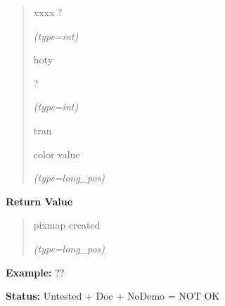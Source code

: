 \begin{boxedminipage}{\funcwidth}
\begin{quote}
\begin{Ventry}{xxxx}
          ?

            {\it (type=int)}

          \item[hoty]

          ?

            {\it (type=int)}

          \item[tran]

          color value

            {\it (type=long\_pos)}

        \end{Ventry}

      \end{quote}

      \textbf{Return Value}
    \vspace{-1ex}

      \begin{quote}
      pixmap created

      {\it (type=long\_pos)}

      \end{quote}

\textbf{Example:} ??



\textbf{Status:} Untested + Doc + NoDemo = NOT OK



    \end{boxedminipage}

    \label{xformslib:flbitmap:fl_free_pixmap}

    \vspace{0.5ex}

